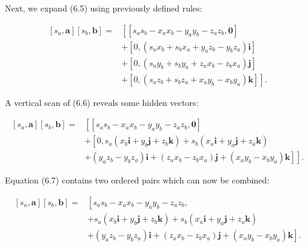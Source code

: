 Next, we expand (6.5) using previously defined rules:

$$
    \begin{aligned}
        {\left[s_{a}, \mathbf{a}\right]\left[s_{b}, \mathbf{b}\right]=} & {\left[\left[s_{a} s_{b}-x_{a} x_{b}-y_{a} y_{b}-z_{a} z_{b}, \mathbf{0}\right]\right.}                \\
                                                                        & +\left[0,\left(s_{a} x_{b}+s_{b} x_{a}+y_{a} z_{b}-y_{b} z_{a}\right) \mathbf{i}\right]                \\
                                                                        & +\left[0,\left(s_{a} y_{b}+s_{b} y_{a}+z_{a} x_{b}-z_{b} x_{a}\right) \mathbf{j}\right]                \\
                                                                        & \left.+\left[0,\left(s_{a} z_{b}+s_{b} z_{a}+x_{a} y_{b}-x_{b} y_{a}\right) \mathbf{k}\right]\right] .
    \end{aligned}
$$

A vertical scan of (6.6) reveals some hidden vectors:

$$
    \begin{aligned}
        {\left[s_{a}, \mathbf{a}\right]\left[s_{b}, \mathbf{b}\right]=} & {\left[\left[s_{a} s_{b}-x_{a} x_{b}-y_{a} y_{b}-z_{a} z_{b}, \mathbf{0}\right]\right.}                                                                                      \\
                                                                        & +\left[0, s_{a}\left(x_{b} \mathbf{i}+y_{b} \mathbf{j}+z_{b} \mathbf{k}\right)+s_{b}\left(x_{a} \mathbf{i}+y_{a} \mathbf{j}+z_{a} \mathbf{k}\right)\right.                   \\
                                                                        & \left.\left.+\left(y_{a} z_{b}-y_{b} z_{a}\right) \mathbf{i}+\left(z_{a} x_{b}-z_{b} x_{a}\right) \mathbf{j}+\left(x_{a} y_{b}-x_{b} y_{a}\right) \mathbf{k}\right]\right] .
    \end{aligned}
$$

Equation (6.7) contains two ordered pairs which can now be combined:

$$
    \begin{aligned}
        {\left[s_{a}, \mathbf{a}\right]\left[s_{b}, \mathbf{b}\right]=} & {\left[s_{a} s_{b}-x_{a} x_{b}-y_{a} y_{b}-z_{a} z_{b},\right.}                                                                                                 \\
                                                                        & +s_{a}\left(x_{b} \mathbf{i}+y_{b} \mathbf{j}+z_{b} \mathbf{k}\right)+s_{b}\left(x_{a} \mathbf{i}+y_{a} \mathbf{j}+z_{a} \mathbf{k}\right)                      \\
                                                                        & \left.+\left(y_{a} z_{b}-y_{b} z_{a}\right) \mathbf{i}+\left(z_{a} x_{b}-z_{b} x_{a}\right) \mathbf{j}+\left(x_{a} y_{b}-x_{b} y_{a}\right) \mathbf{k}\right] .
    \end{aligned}
$$

